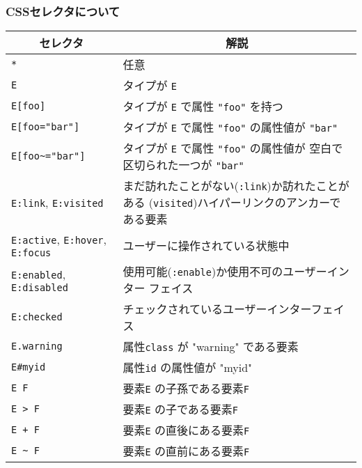 \begin{frame}[containsverbatim]
 \frametitle{CSSセレクタについて}
 {\footnotesize
\begin{tabular}{|m{13em}|m{}|}\hline
\multicolumn{1}{|c|}{セレクタ}&\multicolumn{1}{c|}{解説}\\\hline
\Verb+*+&任意%
\\\hline
\Verb+E+&タイプが \Verb+E+ %
\\\hline
\Verb+E[foo]+&タイプが \Verb+E+ で属性 \Verb+"foo"+ を持つ%
\\\hline
\Verb+E[foo="bar"]+&タイプが \Verb+E+ で属性 \Verb+"foo"+ の属性値が
     \Verb+"bar"+%
\\\hline
\Verb+E[foo~="bar"]+&タイプが \Verb+E+ で属性 \Verb+"foo"+ の属性値が
     空白で区切られた一つが \Verb+"bar"+%
 \\\hline
\Verb+E:link+, %
\Verb+E:visited+&まだ訪れたことがない(\texttt{:link})か訪れたことがある
     (\texttt{visited})ハイパーリンクのアンカーである要素%
\\\hline
\Verb+E:active+, %
\Verb+E:hover+, %
\Verb+E:focus+&ユーザーに操作されている状態中%
\\\hline
\Verb+E:enabled+, %
\Verb+E:disabled+&使用可能(\texttt{:enable})か使用不可のユーザーインター
     フェイス%
\\\hline
\Verb+E:checked+&チェックされているユーザーインターフェイス%
\\\hline
\Verb+E.warning+&属性\texttt{class} が "warning" である要素%
\\\hline
\Verb+E#myid+&属性\texttt{id} の属性値が "myid" %
\\\hline
\Verb+E F+&要素\texttt{E} の子孫である要素\texttt{F}%
\\\hline
\Verb+E > F+&要素\texttt{E} の子である要素\texttt{F}%
\\\hline
\Verb-E + F-&要素\texttt{E} の直後にある要素\texttt{F}%
\\\hline
\Verb+E ~ F+&要素\texttt{E} の直前にある要素\texttt{F}%
\\\hline
\end{tabular}
 }
\end{frame}
